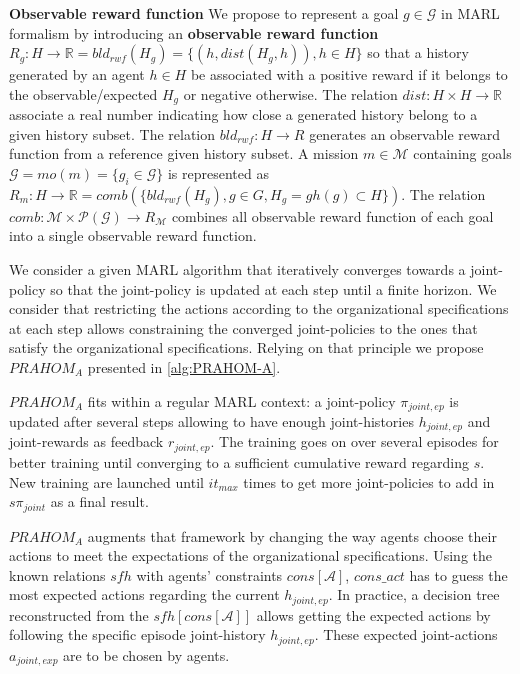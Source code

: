 \documentclass[runningheads]{llncs}
\newcounter{relation}
\newcounter{proof}
\begin{document}

\noindent \textbf{Observable reward function} \quad We propose to represent a goal $g \in \mathcal{G}$ in MARL formalism by introducing an \textbf{observable reward function} $R_{g}: H \rightarrow \mathbb{R} = bld_{rwf}(H_g) = \{(h, dist(H_g,h)), h \in H\}$ so that a history generated by an agent $h \in H$ be associated with a positive reward if it belongs to the observable/expected $H_g$ or negative otherwise. The relation $dist: H \times H \rightarrow \mathbb{R}$ associate a real number indicating how close a generated history belong to a given history subset. The relation $bld_{rwf}: H \rightarrow R$ generates an observable reward function from a reference given history subset.
A mission $m \in \mathcal{M}$ containing goals $\mathcal{G} = mo(m) = \{g_i \in \mathcal{G}\}$ is represented as $R_m: H \rightarrow \mathbb{R} = comb(\{bld_{rwf}(H_g), g \in G, H_g = gh(g) \subset H\})$. The relation $comb: \mathcal{M} \times \mathcal{P}(\mathcal{G}) \rightarrow R_{\mathcal{M}}$ combines all observable reward function of each goal into a single observable reward function.





\noindent We consider a given MARL algorithm that iteratively converges towards a joint-policy so that the joint-policy is updated at each step until a finite horizon.
We consider that restricting the actions according to the organizational specifications at each step allows constraining the converged joint-policies to the ones that satisfy the organizational specifications\footnotemark[1]. Relying on that principle we propose $PRAHOM_A$ presented in \autoref{alg:PRAHOM-A}.

$PRAHOM_A$ fits within a regular MARL context: a joint-policy $\pi_{joint,ep}$ is updated after several steps allowing to have enough joint-histories $h_{joint,ep}$ and joint-rewards as feedback $r_{joint,ep}$. The training goes on over several episodes for better training until converging to a sufficient cumulative reward regarding $s$. New training are launched until $it_{max}$ times to get more joint-policies to add in $s\pi_{joint}$ as a final result.

$PRAHOM_A$ augments that framework by changing the way agents choose their actions to meet the expectations of the organizational specifications. Using the known relations $sfh$ with agents' constraints $cons[\mathcal{A}]$, $cons\_act$ has to guess the most expected actions regarding the current $h_{joint,ep}$. In practice, a decision tree reconstructed from the $sfh[cons[\mathcal{A}]]$ allows getting the expected actions by following the specific episode joint-history $h_{joint,ep}$. These expected joint-actions $a_{joint,exp}$ are to be chosen by agents.
\end{document}
